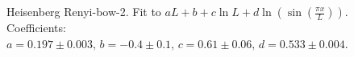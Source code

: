 \documentclass[prl,aps,twocolumn,floatfix,amsmath,amssymb,superscriptaddress,tightenlines]{revtex4}
\begin{document}
\begin{figure}[h]
  \begin{center}
  \end{center}
  \caption{Heisenberg Renyi-bow-2. Fit to $a L + b + c \ln L + d \ln \left( \sin
 \left( \frac{\pi x}{L} \right) \right).$ Coefficients: $a = 0.197\pm 0.003, \, 
b = -0.4 \pm 0.1, \, c = 0.61\pm 0.06, \, d = 0.533 \pm 0.004$.}
  \label{fig:4}
\end{figure}







\end{document}
